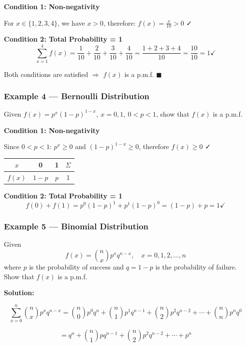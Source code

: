 \documentclass[
]{article}
\begin{document}
\textbf{Condition 1: Non-negativity}

For \(x \in \{1,2,3,4\}\), we have \(x > 0\), therefore:
\(f(x) = \frac{x}{10} > 0\) ✓

\textbf{Condition 2: Total Probability = 1}
\[\sum_{x=1}^{4} f(x) = \frac{1}{10} + \frac{2}{10} + \frac{3}{10} + \frac{4}{10} = \frac{1+2+3+4}{10} = \frac{10}{10} = 1 \checkmark\]

Both conditions are satisfied \(\Rightarrow\) \(f(x)\) is a p.m.f.
\(\blacksquare\)

\subsubsection{Example 4 --- Bernoulli
Distribution}\label{example-4-bernoulli-distribution}

Given \(f(x) = p^x(1-p)^{1-x},\ x = 0, 1,\ 0 < p < 1\), show that
\(f(x)\) is a p.m.f.

\textbf{Condition 1: Non-negativity}

Since \(0 < p < 1\): \(p^x \geq 0\) and \((1-p)^{1-x} \geq 0\),
therefore \(f(x) \geq 0\) ✓

\begin{longtable}[]{@{}cccc@{}}
\toprule\noalign{}
\(x\) & 0 & 1 & \(\Sigma\) \\
\midrule\noalign{}
\endhead
\bottomrule\noalign{}
\endlastfoot
\(f(x)\) & \(1-p\) & \(p\) & 1 \\
\end{longtable}

\textbf{Condition 2: Total Probability = 1}
\[f(0) + f(1) = p^0(1-p)^1 + p^1(1-p)^0 = (1-p) + p = 1 \checkmark\]

\subsubsection{Example 5 --- Binomial
Distribution}\label{example-5-binomial-distribution}

Given \[f(x) = \binom{n}{x} p^x q^{n-x},\quad x = 0, 1, 2, \ldots, n\]
where \(p\) is the probability of success and \(q = 1 - p\) is the
probability of failure. Show that \(f(x)\) is a p.m.f.

\textbf{Solution:}

\[\sum_{x=0}^{n} \binom{n}{x} p^x q^{n-x} = \binom{n}{0}p^0 q^n + \binom{n}{1}p^1 q^{n-1} + \binom{n}{2}p^2 q^{n-2} + \cdots + \binom{n}{n}p^n q^0\]

\[= q^n + \binom{n}{1}pq^{n-1} + \binom{n}{2}p^2 q^{n-2} + \cdots + p^n\]
\end{document}
